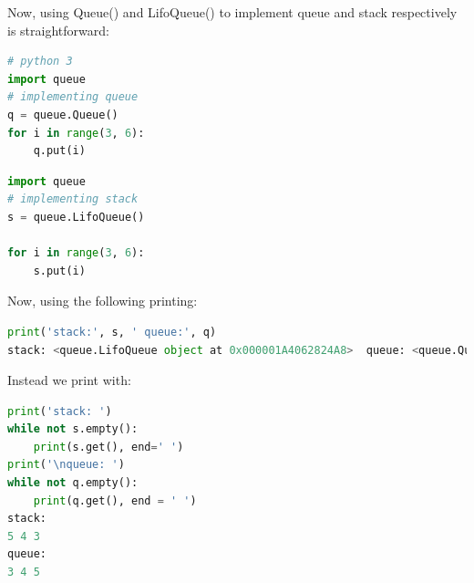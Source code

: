 \documentclass[../main.tex]{subfiles}
\begin{document}
Now, using Queue() and LifoQueue() to implement queue and stack respectively is straightforward: 
\begin{lstlisting}[language = Python]
# python 3
import queue
# implementing queue
q = queue.Queue()
for i in range(3, 6):
    q.put(i)
\end{lstlisting}
\begin{lstlisting}[language = Python]
import queue
# implementing stack
s = queue.LifoQueue()

for i in range(3, 6):
    s.put(i)
\end{lstlisting}
Now, using the following printing:
\begin{lstlisting}[language=Python]
print('stack:', s, ' queue:', q)
stack: <queue.LifoQueue object at 0x000001A4062824A8>  queue: <queue.Queue object at 0x000001A4062822E8>
\end{lstlisting}
Instead we print with:
\begin{lstlisting}[language=Python]
print('stack: ')
while not s.empty():
    print(s.get(), end=' ')
print('\nqueue: ')
while not q.empty():
    print(q.get(), end = ' ')
stack: 
5 4 3 
queue: 
3 4 5 
\end{lstlisting}






\end{document}
